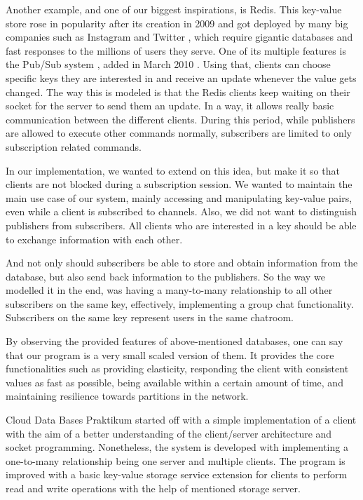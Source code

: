 Another example, and one of our biggest inspirations, is Redis. This key-value store rose in popularity after its creation in 2009 and got deployed by many big companies such as Instagram \cite{krieger2011instagram} and Twitter \cite{yu2014twitter}, which require gigantic databases and fast responses to the millions of users they serve. One of its multiple features is the Pub/Sub system \cite{redis2020pubsub}, added in March 2010 \cite{sanfilippo2010pubsub}. Using that, clients can choose specific keys they are interested in and receive an update whenever the value gets changed. The way this is modeled is that the Redis clients keep waiting on their socket for the server to send them an update. In a way, it allows really basic communication between the different clients.
During this period, while publishers are allowed to execute other commands normally, subscribers are limited to only subscription related commands.




In our implementation, we wanted to extend on this idea, but make it so that clients are not blocked during a subscription session. We wanted to maintain the main use case of our system, mainly accessing and manipulating key-value pairs, even while a client is subscribed to channels. Also, we did not want to distinguish publishers from subscribers. All clients who are interested in a key should be able to exchange information with each other.

And not only should subscribers be able to store and obtain information from the database, but also send back information to the publishers. So the way we modelled it in the end, was having a many-to-many relationship to all other subscribers on the same key, effectively, implementing a group chat functionality. Subscribers on the same key represent users in the same chatroom. 

By observing the provided features of above-mentioned databases, one can say that our program is a very small scaled version of them. It provides the core functionalities such as providing elasticity, responding the client with consistent values as fast as possible, being available within a certain amount of time, and maintaining resilience towards partitions in the network.

Cloud Data Bases Praktikum started off with a simple implementation of a client with the aim of a better understanding of the client/server architecture and socket programming. Nonetheless, the system is developed with implementing a one-to-many relationship being one server and multiple clients. The program is improved with a basic key-value storage service extension for clients to perform read and write operations with the help of mentioned storage server. 


